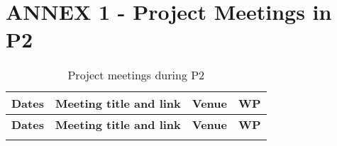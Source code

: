 %

\section{ANNEX 1 - Project Meetings in P2}

\begin{longtable}{|L{0.18\textwidth}|C{0.48\textwidth}|C{0.12\textwidth}|C{0.10\textwidth}|}
\caption{Project meetings during P2}
\label{tab:usp-wp2}
    \\ \hline
    {\bf Dates} & {\bf Meeting title and link} &
     {\bf Venue} & {\bf WP} 
    \\ \hline
    \endfirsthead
    \hline
        {\bf Dates} & {\bf Meeting title and link} &
     {\bf Venue} & {\bf WP} 
  \\ \hline
    \endhead
    \hline
    \endfoot
    

\end{longtable}
